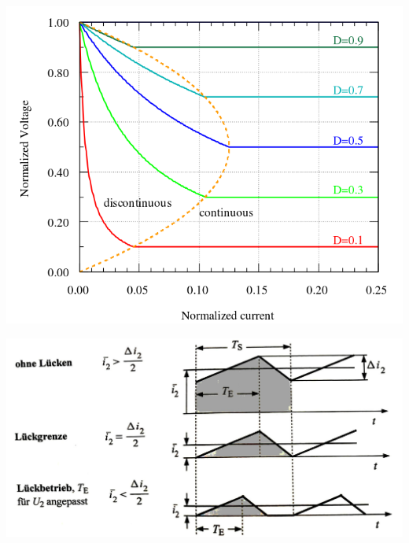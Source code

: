 \begin{minipage}{0.4\linewidth}
    \includegraphics[width=\linewidth]{images/LueckGrenze}
\end{minipage}
\begin{minipage}{0.6\linewidth}
    \includegraphics[width=\linewidth]{images/LueckBetrieb}
\end{minipage}
\clearpage

